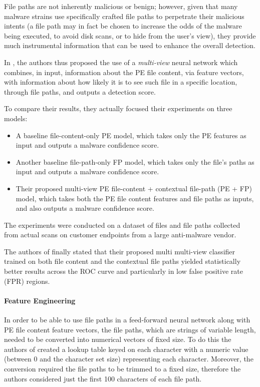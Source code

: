 \documentclass[pdfa%
,cucitura%
]{toptesi}
\begin{document}
File paths are not inherently malicious or benign; however, given that many malware strains use specifically crafted file paths to perpetrate their malicious intents (a file path may in fact be chosen to increase the odds of the malware being executed, to avoid disk scans, or to hide from the user's view), they provide much instrumental information that can be used to enhance the overall detection.

In \cite{KyadigeLFCEIFPIBMD}, the authors thus proposed the use of a \textit{multi-view} neural network which combines, in input, information about the PE file content, via feature vectors, with information about how likely it is to see such file in a specific location, through file paths, and outputs a detection score.

To compare their results, they actually focused their experiments on three models:
\begin{itemize}
	\item A baseline file-content-only PE model, which takes only the PE features as input and outputs a malware confidence score.
	
	\item Another baseline file-path-only FP model, which takes only the file's paths as input and outputs a malware confidence score.
	
	\item Their proposed multi-view PE file-content + contextual file-path (PE + FP) model, which takes both the PE file content features and file paths as inputs, and also outputs a malware confidence score.
\end{itemize}

The experiments were conducted on a dataset of files and file paths collected from actual scans on customer endpoints from a large anti-malware vendor.

The authors of \cite{KyadigeLFCEIFPIBMD} finally stated that their proposed multi multi-view classifier trained on both file content and the contextual file paths yielded statistically better results across the ROC curve and particularly in low false positive rate (FPR) regions.

\paragraph{Feature Engineering}
In order to be able to use file paths in a feed-forward neural network along with PE file content feature vectors, the file paths, which are strings of variable length, needed to be converted into numerical vectors of fixed size. To do this the authors of \cite{KyadigeLFCEIFPIBMD} created a lookup table keyed on each character with a numeric value (between 0 and the character set size) representing each character. Moreover, the conversion required the file paths to be trimmed to a fixed size, therefore the authors considered just the first 100 characters of each file path.
\end{document}
